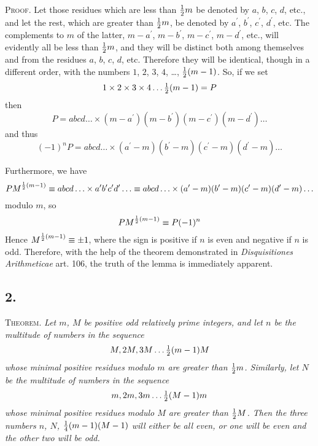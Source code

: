 \documentclass[twoside,12pt]{memoir}
\let\oldfrac\frac
\def\frac#1#2{\mathchoice{\tfrac{#1}{#2}}{\oldfrac{#1}{#2}}{\genfrac{}{}{}{2}{#1}{#2\mathstrut}}{\genfrac{}{}{}{3}{#1}{#2\mathstrut}}}
\begin{document}
\textsc{Proof.} Let those residues which are less than \(\frac{1}{2} m\) be denoted by \(a\), \(b\), \(c\), \(d\), etc{.}, and let the rest, which are greater than \(\frac{1}{2} m\), be denoted by \(a^{\prime}\), \(b^{\prime}\), \(c^{\prime}\), \(d^{\prime}\), etc{.} The complements to \(m\) of the latter,  \(m-a^{\prime}\), \(m-b^{\prime}\), \(m-c^{\prime}\), \(m-d^{\prime}\), etc{.}, will evidently all be less than \(\frac{1}{2} m\), and they will be distinct both among themselves and from the residues \(a\), \(b\), \(c\), \(d\), etc{.} Therefore they will be identical, though in a different order, with the numbers \(1\), \(2\), \(3\), \(4\), \ldots, \(\frac{1}{2}(m-1)\). So, if we set
\[1 \times 2 \times 3 \times 4 \ldots \frac{1}{2}(m-1)=P\]
then
\[P=a b c d \ldots \times(m-a^{\prime})(m-b^{\prime})(m-c^{\prime})(m-d^{\prime}) \ldots\]
and thus
\[(-1)^{n} P=a b c d \ldots \times(a^{\prime}-m)(b^{\prime}-m)(c^{\prime}-m)(d^{\prime}-m) \ldots\]

Furthermore, we have 
\[P M^{\frac{1}{2}(m-1)} \equiv a b c d \ldots \times a^{\prime} b^{\prime} c^{\prime} d^{\prime} \ldots \equiv a b c d \ldots \times(a^{\prime}-m)(b^{\prime}-m)(c^{\prime}-m)(d^{\prime}-m) \ldots\]
modulo \(m\), so
\[P M^{\frac{1}{2}(m-1)} \equiv P(-1)^{n}\]
Hence \(M^{\frac{1}{2}(m-1)} \equiv \pm 1\), where the sign is positive if \(n\) is even and negative if \(n\) is odd.  Therefore, with the help of the theorem demonstrated in \textit{Disquisitiones Arithmeticae} art. 106, the truth of the lemma is immediately apparent.\pagebreak%

\subsection*{2.}
 
\textsc{Theorem.} \textit{Let \(m\), \(M\) be positive odd relatively prime integers, and let \(n\) be the multitude of numbers in the sequence}
\[M, 2 M, 3 M \ldots  \frac{1}{2}(m-1) M\]
\textit{whose minimal positive residues modulo \(m\) are greater than \(\frac{1}{2} m\).  Similarly, let \(N\) be the multitude of numbers in the sequence}
\[m, 2 m, 3 m \ldots \frac{1}{2}(M-1) m\]
\textit{whose minimal positive residues modulo \(M\) are greater than \(\frac{1}{2} M\). Then the three numbers \(n\), \(N\), \(\frac{1}{4}(m-1)(M-1)\) will either be all even, or one will be even and the other two will be odd.}
 
\end{document}
